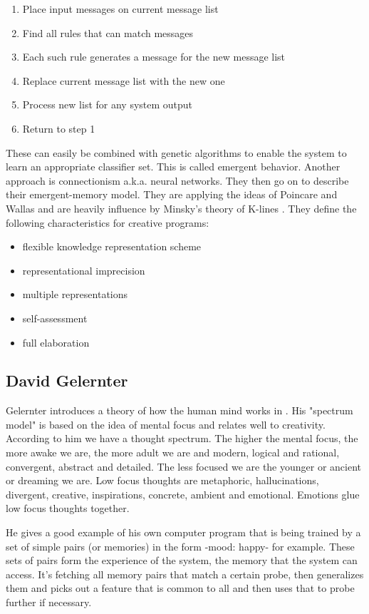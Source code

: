 \begin{enumerate}
  \item Place input messages on current message list
  \item Find all rules that can match messages
  \item Each such rule generates a message for the new message list
  \item Replace current message list with the new one
  \item Process new list for any system output
  \item Return to step 1
\end{enumerate}

These can easily be combined with genetic algorithms to enable the system to learn an appropriate classifier set. This is called emergent behavior. Another approach is connectionism a.k.a. neural networks. They then go on to describe their emergent-memory model. They are applying the ideas of Poincare and Wallas and are heavily influence by Minsky's theory of K-lines \citep{Minsky1980, Minsky1988}. They define the following characteristics for creative programs:

\begin{itemize}
  \item flexible knowledge representation scheme
  \item representational imprecision
  \item multiple representations
  \item self-assessment
  \item full elaboration
\end{itemize}

\subsection{David Gelernter}

Gelernter introduces a theory of how the human mind works in \citep{Gelernter1994}. His "spectrum model" is based on the idea of mental focus and relates well to creativity. According to him we have a thought spectrum. The higher the mental focus, the more awake we are, the more adult we are and modern, logical and rational, convergent, abstract and detailed. The less focused we are the younger or ancient or dreaming we are. Low focus thoughts are metaphoric, hallucinations, divergent, creative, inspirations, concrete, ambient and emotional. Emotions glue low focus thoughts together.

He gives a good example of his own computer program that is being trained by a set of simple pairs (or memories) in the form -mood: happy- for example. These sets of pairs form the experience of the system, the memory that the system can access. It's fetching all memory pairs that match a certain probe, then generalizes them and picks out a feature that is common to all and then uses that to probe further if necessary.

